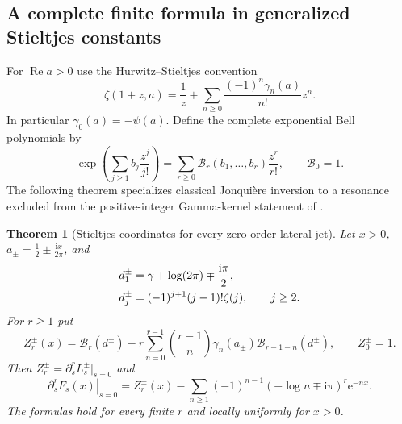 \documentclass[11pt,a4paper]{article}
\numberwithin{equation}{section}
\newtheorem{theorem}{Theorem}[section]
\theoremstyle{definition}\newtheorem{definition}[theorem]{Definition}
\theoremstyle{remark}\newtheorem{remark}[theorem]{Remark}
\newcommand{\ee}{\mathrm e}\newcommand{\ii}{\mathrm i}\newcommand{\dd}{\,\mathrm d}
\newcommand{\Rea}{\operatorname{Re}}\newcommand{\Ima}{\operatorname{Im}}
\newcommand{\B}{\mathcal B}\newcommand{\calF}{\mathcal F}\newcommand{\calL}{\mathcal L}
\begin{document}
\subsection{A complete finite formula in generalized Stieltjes constants}
For $\Rea a>0$ use the Hurwitz--Stieltjes convention \cite{DLMFhurwitz}
\begin{equation}\label{ojf:eq:stieltjes}
 \zeta(1+z,a)=\frac1z+
       \sum_{n\ge0}\frac{(-1)^n\gamma_n(a)}{n!}z^n.
\end{equation}
In particular $\gamma_0(a)=-\psi(a)$.
Define the complete exponential Bell polynomials by
\begin{equation}\label{ojf:eq:bell}
 \exp\left(\sum_{j\ge1}b_j\frac{z^j}{j!}\right)
       =\sum_{r\ge0}\B_r(b_1,\ldots,b_r)\frac{z^r}{r!},
 \qquad\B_0=1.
\end{equation}
The following theorem specializes classical Jonqui\`ere inversion to a
resonance excluded from the positive-integer Gamma-kernel statement of
\cite{RepoResonant}.

\begin{theorem}[Stieltjes coordinates for every zero-order lateral jet]
\label{ojf:thm:stieltjes}
Let $x>0$, $a_\pm=\frac12\pm\frac{\ii x}{2\pi}$, and
\begin{align}
 d_1^\pm&=\gamma+\log(2\pi)\mp\frac{\ii\pi}{2},\label{ojf:eq:dj}\\
 d_j^\pm&=(-1)^{j+1}(j-1)!\zeta(j),\qquad j\ge2.\notag
\end{align}
For $r\ge1$ put
\begin{equation}\label{ojf:eq:stieltjes-jet}
 Z_r^\pm(x)=\B_r(d^\pm)
       -r\sum_{n=0}^{r-1}\binom{r-1}{n}
                    \gamma_n(a_\pm)\B_{r-1-n}(d^\pm),
 \qquad Z_0^\pm=1.
\end{equation}
Then $Z_r^\pm=\partial_s^rL_s^\pm|_{s=0}$ and
\begin{equation}\label{ojf:eq:physical-zero-jets}
 \left.\partial_s^rF_s(x)\right|_{s=0}
  =Z_r^\pm(x)-\sum_{n\ge1}(-1)^{n-1}
                     (-\log n\mp\ii\pi)^r\ee^{-nx}.
\end{equation}
The formulas hold for every finite $r$ and locally uniformly for $x>0$.
\end{theorem}
\end{document}
